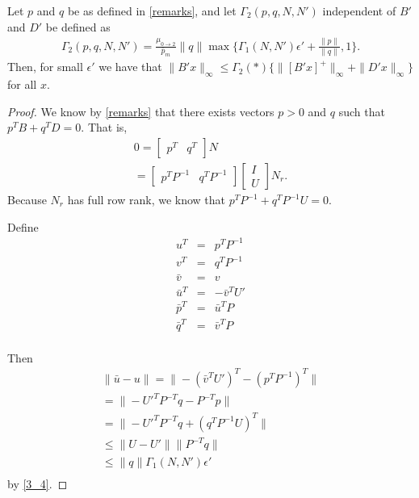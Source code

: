 \begin{theorem}
\label{3_5}
Let $p$ and $q$ be as defined in \cref{remarks}, and let $\Gamma_2(p, q, N, N')$ independent of $B'$ and $D'$ be defined as 
\begin{align*}
\Gamma_2(p, q, N, N') = \frac {\mu_{0\to 2}} {\bar p_m} \|q\|\max\big\{\Gamma_1(N, N')\epsilon' + \frac{\|p\|}{\|q\|}, 1\big\}.
\end{align*}
Then, for small $\epsilon'$ we have that $\|B'x\|_{\infty} \le \Gamma_2(*)\{\|[B'x]^+\|_{\infty} + \|D'x\|_{\infty}\}$ for all $x$.
\end{theorem}

\begin{proof}
We know by \cref{remarks} that there exists vectors $p > 0$ and $q$ such that $p^T B + q^T D = 0$.
That is,
\begin{align*}
0 = \begin{bmatrix}p^T & q^T\end{bmatrix}N \\
= \begin{bmatrix}p^TP^{-1} & q^TP^{-1}\end{bmatrix} \begin{bmatrix} I \\ U \end{bmatrix} N_r.
\end{align*}
Because $N_r$ has full row rank, we know that $p^TP^{-1} + q^TP^{-1}U = 0$.

Define 
\begin{align*}
u^T & = & p^TP^{-1} \\
v^T & = & q^T P^{-1} \\
\bar v & = & v \\
\bar u^T & = & -{\bar{v}}^TU' \\
\bar p^T & = & \bar u ^T P \\
\bar q^T & = & \bar v ^T P \\
\end{align*}

Then
\begin{align*}
\|\bar u - u \| = \|-({\bar{v}}^TU')^T - (p^TP^{-1})^T\|\\
 = \|-U'^TP^{-T}q - P^{-T}p\|\\
 = \|-U'^TP^{-T}q  + (q^TP^{-1}U)^T\|\\
 \le \|U - U'\| \|P^{-T}q\|\\
 \le \|q\| \Gamma_1(N, N') \epsilon'\\
\end{align*}
 by \cref{3_4}.



\end{proof}
